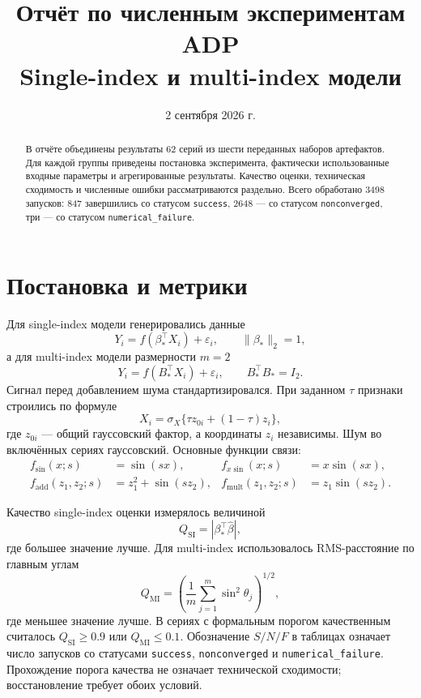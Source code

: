 \documentclass[11pt,a4paper]{article}
\title{Отчёт по численным экспериментам ADP\\
\large Single-index и multi-index модели}
\author{}
\date{2 сентября 2026 г.}
\newcommand{\code}[1]{\texttt{#1}}
\newcommand{\qsi}{Q_{\mathrm{SI}}}
\newcommand{\qmi}{Q_{\mathrm{MI}}}
\newcommand{\snf}{S/N/F}
\begin{document}
\maketitle

\begin{abstract}
В отчёте объединены результаты 62 серий из шести переданных наборов
артефактов. Для каждой группы приведены постановка эксперимента,
фактически использованные входные параметры и агрегированные результаты.
Качество оценки, техническая сходимость и численные ошибки рассматриваются
раздельно. Всего обработано 3498 запусков: 847 завершились со статусом
\code{success}, 2648 --- со статусом \code{nonconverged}, три --- со
статусом \code{numerical\_failure}.
\end{abstract}

\section{Постановка и метрики}

Для single-index модели генерировались данные
\begin{equation}
    Y_i = f(\beta_*^\top X_i) + \varepsilon_i,
    \qquad \|\beta_*\|_2=1,
\end{equation}
а для multi-index модели размерности $m=2$
\begin{equation}
    Y_i = f(B_*^\top X_i) + \varepsilon_i,
    \qquad B_*^\top B_*=I_2.
\end{equation}
Сигнал перед добавлением шума стандартизировался. При заданном $\tau$
признаки строились по формуле
\begin{equation}
    X_i = \sigma_X\{\tau z_{0i}+(1-\tau)z_i\},
\end{equation}
где $z_{0i}$ --- общий гауссовский фактор, а координаты $z_i$ независимы.
Шум во включённых сериях гауссовский. Основные функции связи:
\begin{align}
 f_{\sin}(x;s)&=\sin(sx), &
 f_{x\sin}(x;s)&=x\sin(sx),\\
 f_{\mathrm{add}}(z_1,z_2;s)&=z_1^2+\sin(sz_2), &
 f_{\mathrm{mult}}(z_1,z_2;s)&=z_1\sin(sz_2).
\end{align}

Качество single-index оценки измерялось величиной
\begin{equation}
    \qsi=|\beta_*^\top\widehat\beta|,
\end{equation}
где большее значение лучше. Для multi-index использовалось RMS-расстояние
по главным углам
\begin{equation}
    \qmi=
    \left(\frac{1}{m}\sum_{j=1}^{m}\sin^2\theta_j\right)^{1/2},
\end{equation}
где меньшее значение лучше. В сериях с формальным порогом качественным
считалось $\qsi\geq0.9$ или $\qmi\leq0.1$. Обозначение $\snf$ в таблицах
означает число запусков со статусами \code{success},
\code{nonconverged} и \code{numerical\_failure}. Прохождение порога качества
не означает технической сходимости; восстановление требует обоих условий.
\end{document}
